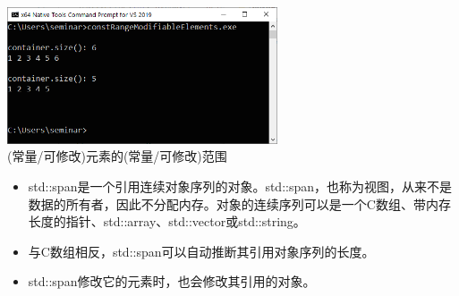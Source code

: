 \begin{center}
\includegraphics[width=0.6\textwidth]{content/3/chapter5/images/9.png}\\
(常量/可修改)元素的(常量/可修改)范围
\end{center}

\begin{tcolorbox}[breakable,enhanced jigsaw,colback=mygreen!5!white,colframe=mygreen!75!black,title={总结}]

\begin{itemize}
\item 
std::span是一个引用连续对象序列的对象。std::span，也称为视图，从来不是数据的所有者，因此不分配内存。对象的连续序列可以是一个C数组、带内存长度的指针、std::array、std::vector或std::string。

\item 
与C数组相反，std::span可以自动推断其引用对象序列的长度。

\item 
std::span修改它的元素时，也会修改其引用的对象。
\end{itemize}

\end{tcolorbox}

\newpage








